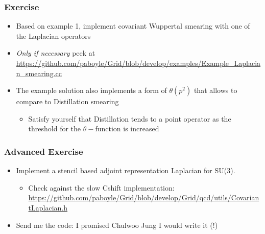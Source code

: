 \documentclass[pdf,ps,8pt]{beamer}
\newcommand{\link}[1]{\href{#1}{ {\color{blue} #1} }}
\begin{document}
\begin{frame}[fragile]\small\frametitle{ Exercise}

\begin{itemize}
\item Based on example 1, implement covariant Wuppertal smearing with one of the Laplacian operators 
\item \emph{Only if necessary} peek at
  \href{https://github.com/paboyle/Grid/blob/develop/examples/Example_Laplacian_smearing.cc}{\color{blue}https://github.com/paboyle/Grid/blob/develop/examples/Example\_Laplacian\_smearing.cc}
\item The example solution also implements a form of $\theta(p^2)$ that allows to compare to Distillation smearing
\begin{itemize}
\item Satisfy yourself that Distillation tends to a point operator as the threshold for the $\theta-$function is increased
\end{itemize}
\end{itemize}

\end{frame}
  
\begin{frame}[fragile]\small\frametitle{ Advanced Exercise}

\begin{itemize}
\item Implement a stencil based adjoint representation Laplacian for SU(3).
\begin{itemize}
\item Check against the slow Cshift implementation: \link{https://github.com/paboyle/Grid/blob/develop/Grid/qcd/utils/CovariantLaplacian.h}
\end{itemize}
\item Send me the code: I promised Chulwoo Jung I would write it (!)
\end{itemize}

\end{frame}
\end{document}
